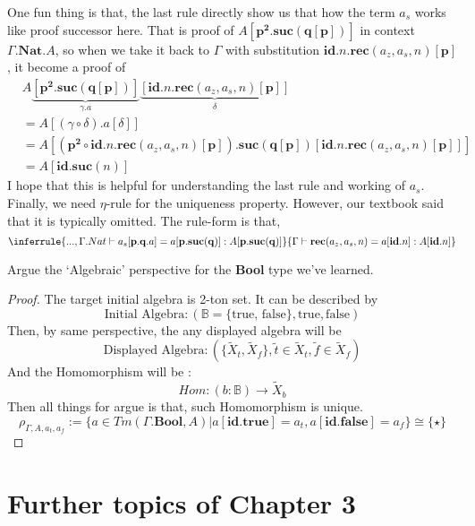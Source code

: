 \documentclass[12pt, a4paper, openany, twoside]{book}
\theoremstyle{definition}
\theoremstyle{remark}
\theoremstyle{plain}
\numberwithin{equation}{section}
\begin{document}
\noindent One fun thing is that, the last rule directly show us that how the term $a_s$ works like proof successor here. 
That is proof of $A[\mathbf{p^2.suc(q[p])}]$ in context $\Gamma.\mathbf{Nat}.A$, so when we take it back to $\Gamma$ with 
substitution $\mathbf{id}.n.\mathbf{rec}(a_z, a_s, n)[\mathbf{p}]$, it become a proof of 
\begin{align*}
    & A\underbrace{[\mathbf{p^2.suc(q[p])}]}_{\gamma.a}\underbrace{[\mathbf{id}.n.\mathbf{rec}(a_z, a_s, n)[\mathbf{p}]]}_{\delta}  \\
    & = A[(\gamma \circ \delta).a[\delta]] \\
    & = A[(\mathbf{p^2} \circ \mathbf{id}.n.\mathbf{rec}(a_z, a_s, n)[\mathbf{p}]).\mathbf{suc(q[p])}[\mathbf{id}.n.\mathbf{rec}(a_z, a_s, n)[\mathbf{p}]]] \\
    & = A[\mathbf{id}.\mathbf{suc}(n)]
\end{align*}
I hope that this is helpful for understanding the last rule and working of $a_s$. 
\\
Finally, we need $\eta$-rule for the uniqueness property. However, our textbook said that it is typically omitted. 
The rule-form is that, 
\[
\inferrule
{
    ..., \Gamma.Nat \vdash a_s[\mathbf{p.q}.a] = a[\mathbf{p.suc(q)}] : A[\mathbf{p.suc(q)}]
}
{
    \Gamma \vdash \mathbf{rec}(a_z, a_s, n) = a[\mathbf{id}.n] : A[\mathbf{id}.n]
}
\]
\begin{tcolorbox}[breakable, colback=yellow!10!white,colframe=brown!75!black,title=Exercise 3.4.1.]\hypertarget{Exer 3.4.1.}{}
Argue the \lq Algebraic' perspective for the \textbf{Bool} type we've learned. 
\begin{proof}
    
The target initial algebra is 2-ton set. It can be described by 
\[\text{Initial Algebra} : (\mathbb{B} = \{\text{true, false}\}, \text{true}, \text{false})\]
Then, by same perspective, the any displayed algebra will be 
\[\text{Displayed Algebra} : (\{\tilde{X}_t, \tilde{X}_f\}, \tilde{t} \in \tilde{X}_t, \tilde{f} \in \tilde{X}_f)\]
And the Homomorphism will be : 
\[Hom : (b : \mathbb{B}) \rightarrow \tilde{X}_b\]
Then all things for argue is that, such Homomorphism is unique. 
\[\rho_{\Gamma, A, a_t, a_f} := \{a \in Tm(\Gamma.\mathbf{Bool}, A) | a[\mathbf{id.true}] = a_t, a[\mathbf{id.false}] = a_f\} \cong \{\star\}\]
\end{proof}
\end{tcolorbox}

\newpage 

\chapter{Further topics of Chapter 3}
\end{document}
